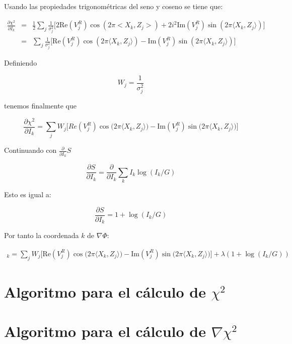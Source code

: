 Usando las propiedades trigonométricas del seno y coseno se tiene que:

\begin{eqnarray}
\frac{\partial\chi^{2}}{\partial I_{k}} & = & \frac{1}{2}\sum\limits_{j}\frac{1}{\sigma_{j}^{2}}\biggl[2\text{Re}(V_{j}^{R})\cos(2\pi <X_k,Z_j>)+2i^{2}\text{Im}(V_{j}^{R})\sin(2\pi \langle X_k,Z_j\rangle )\biggr] \\
                                      & = & \sum\limits_{j}\frac{1}{\sigma_{j}^{2}}\biggl[\text{Re}(V_{j}^{R}) \cos(2\pi\langle X_k,Z_j\rangle) - \text{Im}(V_{j}^{R})\sin(2\pi \langle X_k,Z_j\rangle)\biggr]
\end{eqnarray}

Definiendo

\begin{equation}
W_{j} = \frac{1}{\sigma_{j}^{2}}
\end{equation}

tenemos finalmente que

\begin{equation}
\frac{\partial\chi^{2}}{\partial I_{k}} = \sum\limits_{j}W_{j}\biggl[Re(V_{j}^{R})\cos\bigl(2\pi \langle X_k,Z_j\rangle\bigr)-\text{Im}(V_{j}^{R})\sin\bigl(2\pi \langle X_k,Z_j\rangle\bigr)\biggr]
\label{eq:dchi2}
\end{equation}

Continuando con $\frac{\partial}{\partial I_{k}}S$

\begin{equation}
\frac{\partial S}{\partial I_{k}} = \frac{\partial}{\partial I_{k}}\sum\limits_{k}I_{k}\log(I_{k}/G)
\end{equation}

Esto es igual a:


\begin{equation}
\frac{\partial S}{\partial I_{k}} = 1+\log(I_{k}/G)
\end{equation}


Por tanto la coordenada $k$ de $\nabla\Phi$:

\begin{multline}
[\nabla \Phi]_k = \sum\limits_{j}W_{j}\biggl[\text{Re}(V_{j}^{R})\cos\bigl(2\pi \langle X_k,Z_j \rangle\bigr)-\text{Im}(V_{j}^{R})\sin\bigl(2\pi \langle X_k,Z_j \rangle\bigr)\biggr] +
\lambda(1 + \log(I_{k}/G))
\label{eq:dphifinal}
\end{multline}

\chapter{Algoritmo para el cálculo de $\chi^{2}$}

\chapter{Algoritmo para el cálculo de $\nabla \chi^{2}$}

